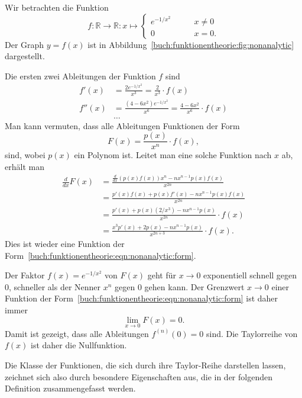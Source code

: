\begin{beispiel}
\label{buch:funktionentheorie:beispiel:nichtanalytisch}
Wir betrachten die Funktion
\[
f\colon \mathbb{R}\to\mathbb{R}
:
x \mapsto
\begin{cases}
e^{-1/x^2}&\qquad x\ne 0\\
0&\qquad x=0.
\end{cases}
\]
Der Graph $y=f(x)$ ist in Abbildung~\ref{buch:funktionentheorie:fig:nonanalytic}
dargestellt.

Die ersten zwei Ableitungen der Funktion $f$ sind
\begin{align*}
f'(x) &= \frac{2e^{-1/x^2}}{x^3} = \frac{2}{x^3}\cdot f(x)
\\
f''(x) &= \frac{(4-6x^2) e^{-1/x^2}}{x^6} = \frac{4-6x^2}{x^6}\cdot f(x)
\\
&\dots
\end{align*}
Man kann vermuten, dass alle
Ableitungen Funktionen der Form
\begin{equation}
F(x) = \frac{p(x)}{x^n} \cdot f(x),
\label{buch:funktionentheorie:eqn:nonanalytic:form}
\end{equation}
sind,
wobei $p(x)$ ein Polynom ist.
Leitet man eine solche Funktion nach $x$ ab, erhält man
\begin{align*}
\frac{d}{dx} F(x)
&=
\frac{\frac{d}{dx}(p(x)f(x)) x^n - nx^{n-1}p(x)f(x)}{x^{2n}}
\\
&=
\frac{p'(x)f(x) + p(x)f'(x) - nx^{n-1}p(x)f(x)}{x^{2n}} 
\\
&=
\frac{p'(x) + p(x)(2/x^3) - nx^{n-1}p(x)}{x^{2n}} \cdot f(x)
\\
&=
\frac{x^3p'(x)+2p(x)-nx^{n-1}p(x)}{x^{2n+3}}\cdot f(x).
\end{align*}
Dies ist wieder eine Funktion der
Form~\eqref{buch:funktionentheorie:eqn:nonanalytic:form}.

Der Faktor $f(x)=e^{-1/x^2}$ von $F(x)$ geht für $x\to 0$ exponentiell
schnell gegen $0$, schneller als der Nenner $x^n$ gegen $0$ gehen
kann. 
Der Grenzwert $x\to 0$ einer Funktion der 
Form~\eqref{buch:funktionentheorie:eqn:nonanalytic:form}
ist daher immer
\[
\lim_{x\to 0}  F(x) =0.
\]
Damit ist gezeigt, dass alle Ableitungen $f^{(n)}(0)=0$ sind.
Die Taylorreihe von $f(x)$ ist daher die Nullfunktion.
\end{beispiel}

Die Klasse der Funktionen, die sich durch ihre Taylor-Reihe darstellen
lassen, zeichnet sich also durch besondere Eigenschaften aus, die in
der folgenden Definition zusammengefasst werden.

